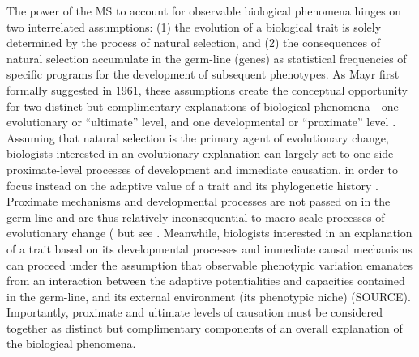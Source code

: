 The power of the MS to account for observable biological phenomena hinges on two interrelated assumptions: (1) the evolution of a biological trait is solely determined by the process of natural selection, and (2) the consequences of natural selection accumulate in the germ-line (genes) as statistical frequencies of specific programs for the development of subsequent phenotypes.  As Mayr first formally suggested in 1961, these assumptions create the conceptual opportunity for two distinct but complimentary explanations of biological phenomena---one evolutionary or ``ultimate'' level, and one developmental or ``proximate'' level \citep{Mayr1961}.  Assuming that natural selection is the primary agent of evolutionary change, biologists interested in an evolutionary explanation can largely set to one side proximate-level processes of development and immediate causation, in order to focus instead on the adaptive value of a trait and its phylogenetic history \citep{Mayr1961,Tinbergen1963}.  Proximate mechanisms and developmental processes are not passed on in the germ-line and are thus relatively inconsequential to macro-scale processes of evolutionary change (\citep{Dawkins1982,Grafen1991,Svensson2017} but see \citep{Laland2012,Laland2015}.  Meanwhile, biologists interested in an explanation of a trait based on its developmental processes and immediate causal mechanisms can proceed under the assumption that observable phenotypic variation emanates from an interaction between the adaptive potentialities and capacities contained in the germ-line, and its external environment (its phenotypic niche) (SOURCE).  Importantly, proximate and ultimate levels of causation must be considered together as distinct but complimentary components of an overall explanation of the biological phenomena\citep{Mayr1961,Tinbergen1963}.
%

